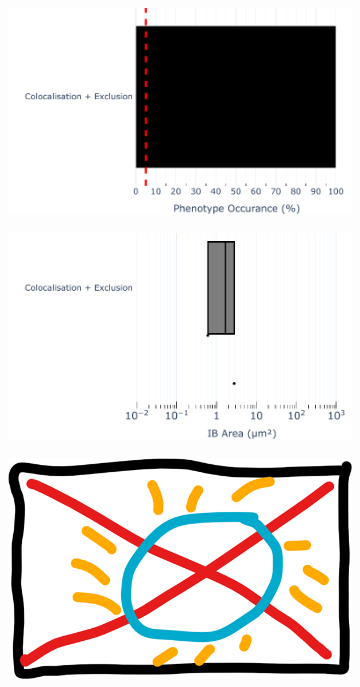 \begin{figure}
    \begin{subfigure}{0.5\textwidth}
        \caption{}
        \includegraphics[width=1\linewidth]{10. Chapter 5/Figs/04. IFIT2-RNA binding mutant/02. pIB/04. bar_bi2f24_bnbp.pdf} 
    \end{subfigure}
    \begin{subfigure}{0.5\textwidth}
        \caption{}
        \includegraphics[width=1\linewidth]{10. Chapter 5/Figs/04. IFIT2-RNA binding mutant/02. pIB/05. box_bi2f24_bnbp.pdf}
    \end{subfigure}
    \begin{subfigure}{1\textwidth}
        \centering
        \caption{}
        \includegraphics[width=1\linewidth]{10. Chapter 5/Figs/00. placeholder.png}

\end{subfigure}
\end{figure}

